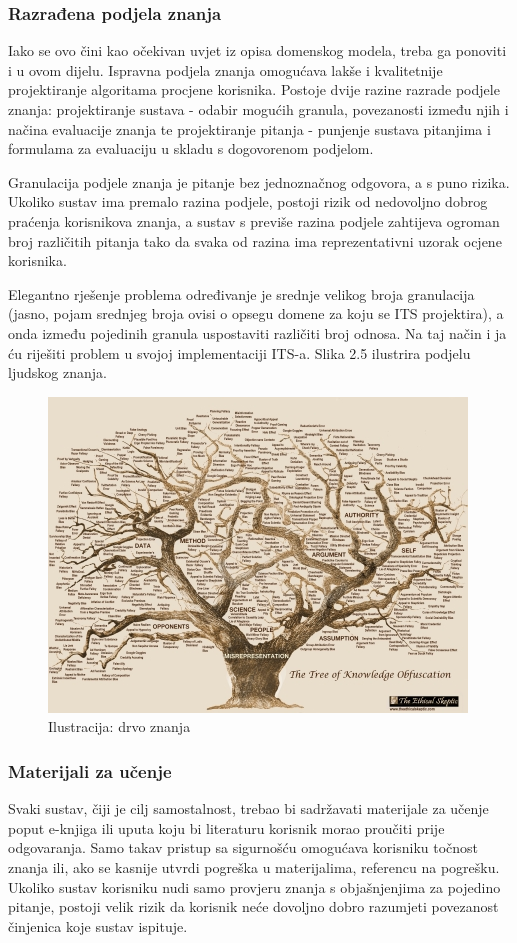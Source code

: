 \documentclass[times, utf8, zavrsni, numeric]{fer}
\begin{document}
\subsubsection{Razrađena podjela znanja}
Iako se ovo čini kao očekivan uvjet iz  opisa domenskog modela, treba ga ponoviti i u ovom dijelu. Ispravna podjela znanja omogućava lakše i kvalitetnije projektiranje algoritama procjene korisnika.\citep{knowledgerep} Postoje dvije razine razrade podjele znanja: projektiranje sustava - odabir mogućih granula, povezanosti između njih i načina evaluacije znanja te projektiranje pitanja - punjenje sustava pitanjima i formulama za evaluaciju u skladu s dogovorenom podjelom.
\par
Granulacija podjele znanja je pitanje bez jednoznačnog odgovora, a s puno rizika. Ukoliko sustav ima premalo razina podjele, postoji rizik od nedovoljno dobrog praćenja korisnikova znanja, a sustav s previše razina podjele zahtijeva ogroman broj različitih pitanja tako da svaka od razina ima reprezentativni uzorak ocjene korisnika.
\par
Elegantno rješenje problema određivanje je srednje velikog broja granulacija (jasno, pojam srednjeg broja ovisi o opsegu domene za koju se ITS projektira), a onda između pojedinih granula uspostaviti različiti broj odnosa.\citep{sematicknowledge} Na taj način i ja ću riješiti problem u svojoj implementaciji ITS-a. Slika 2.5 ilustrira podjelu ljudskog znanja.

\begin{figure}[htb]
	\centering
	\includegraphics[]{img/drvo.jpg}
	\caption{Ilustracija: drvo znanja\citep{drvoznanja}}
	\label{fig:drvo}
\end{figure}

\subsubsection{Materijali za učenje}
Svaki sustav, čiji je cilj samostalnost, trebao bi sadržavati materijale za učenje poput e-knjiga ili uputa koju bi literaturu korisnik morao proučiti prije odgovaranja. Samo takav pristup sa sigurnošću omogućava korisniku točnost znanja ili, ako se kasnije utvrdi pogreška u materijalima, referencu na pogrešku. Ukoliko sustav korisniku nudi samo provjeru znanja s objašnjenjima za pojedino pitanje, postoji velik rizik da korisnik neće dovoljno dobro razumjeti povezanost činjenica koje sustav ispituje.
\end{document}
